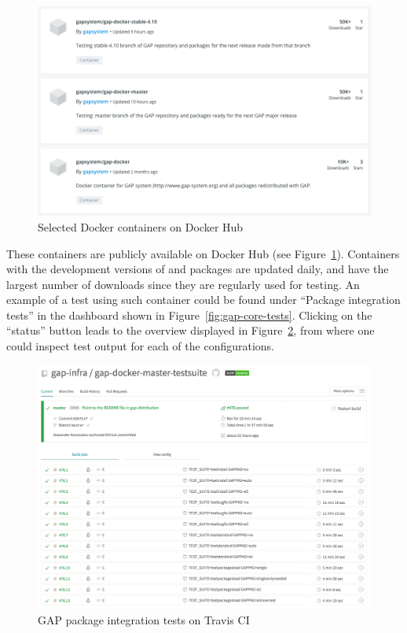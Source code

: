 \begin{figure}[!ht]
    \begin{mdframed}
    \centering
    \includegraphics[width=15cm]{images/gap-docker}
    \end{mdframed}
    \caption{Selected \GAP Docker containers on Docker Hub}
    \label{fig:gap-docker}
\end{figure}
 
These containers are publicly available on Docker Hub (see Figure~\ref{fig:gap-docker}).
Containers with the development versions of \GAP and packages are updated daily, and have
the largest number of downloads since they are regularly used for testing. An example of
a test using such container could be found under ``Package integration
tests'' in the dashboard shown in 
Figure~\ref{fig:gap-core-tests}. Clicking on the ``status'' button leads to the overview displayed
in Figure~\ref{fig:gap-docker-master-testsuite}, from where one could inspect
test output for each of the configurations. 

\begin{figure}[!ht]
    \begin{mdframed}
    \centering
    \includegraphics[width=\textwidth]{images/gap-docker-master-testsuite}
    \end{mdframed}
    \caption{GAP package integration tests on Travis CI}
    \label{fig:gap-docker-master-testsuite}
\end{figure}

